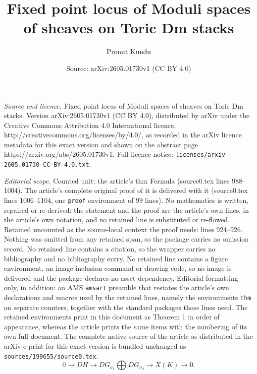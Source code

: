 \documentclass[10pt,a4paper]{amsart}
\title{Fixed point locus of Moduli spaces of sheaves on Toric Dm stacks}
\author{Promit Kundu}
\date{Source: arXiv:2605.01730v1 (CC BY 4.0)}
\begin{document}
\maketitle

\noindent\emph{Source and licence.} Fixed point locus of Moduli spaces of sheaves on Toric Dm stacks. Version arXiv:2605.01730v1 (CC BY 4.0), distributed by arXiv under the Creative Commons Attribution 4.0 International licence, http://creativecommons.org/licenses/by/4.0/, as recorded in the arXiv licence metadata for this exact version and shown on the abstract page https://arxiv.org/abs/2605.01730v1. Full licence notice: \texttt{licenses/arxiv-2605.01730-CC-BY-4.0.txt}.\par\smallskip

\noindent\textit{Editorial scope.} Counted unit: the article's thm Formula (source0.tex lines 988--1004). The article's complete original proof of it is delivered with it (source0.tex lines 1006--1104, one \texttt{proof} environment of 99 lines). No mathematics is written, repaired or re-derived: the statement and the proof are the article's own lines, in the article's own notation, and no retained line is substituted or re-flowed.  Retained uncounted as the source-local context the proof needs: lines 924--926.  Nothing was omitted from any retained span, so the package carries no omission record.  No retained line contains a citation, so the wrapper carries no bibliography and no bibliography entry.  No retained line contains a figure environment, an image-inclusion command or drawing code, so no image is delivered and the package declares no asset dependency.  Editorial formatting only, in addition: an AMS \texttt{amsart} preamble that restates the article's own declarations and macros used by the retained lines, namely the environments \texttt{thm} on separate counters, together with the standard packages those lines need.  The retained environments print in this document as Theorem 1 in order of appearance, whereas the article prints the same items with the numbering of its own full document.  The complete native source of the article as distributed in the arXiv e-print for this exact version is bundled unchanged as \texttt{sources/199655/source0.tex}.
\begin{equation}\label{cokernel}
0\to DH\to DG_{\sigma_1}\bigoplus DG_{\sigma_2}\to X(K)\to 0.    
\end{equation}
\end{document}
